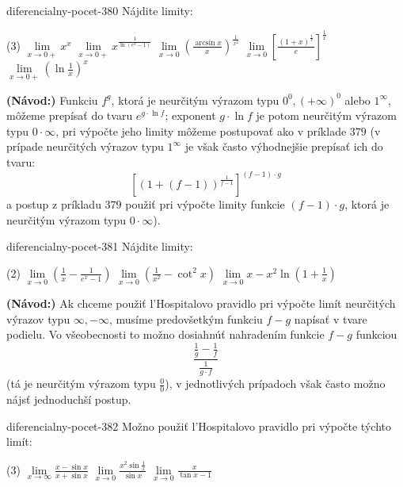 \begin{defproblem}{diferencialny-pocet-380}
Nájdite limity:
\begin{tasks}(3)
  \task $\lim\limits_{x \rightarrow 0+}x^x$
  \task $\lim\limits_{x \rightarrow 0+}x^{\frac{1}{\ln (e^x-1)}}$
  \task $\lim\limits_{x \rightarrow 0}(\frac{\arcsin x}{x})^{\frac{1}{x^2}}$
  \task $\lim\limits_{x \rightarrow 0}[\frac{(1+x)^{\frac{1}{x}}}{e}]^{\frac{1}{x}}$
  \task $\lim\limits_{x \rightarrow 0+}(\ln \frac{1}{x})^x$
\end{tasks}

\begin{solution}
  \textbf{(Návod:)}
  Funkciu $f^g$, ktorá je neurčitým výrazom typu $0^0,(+\infty)^0$ alebo
  $1^{\infty}$, môžeme prepísať do tvaru $e^{g\cdot\ln f}$; exponent $g\cdot\ln
  f$ je potom neurčitým výrazom typu $0\cdot\infty$, pri výpočte jeho limity
  môžeme postupovať ako v príklade $379$ (v prípade neurčitých výrazov typu
  $1^{\infty}$ je však často výhodnejšie prepísať ich do tvaru:
  \[
    [(1+(f-1))^{\frac{1}{f-1}}]^{(f-1)\cdot g}
  \]
  a postup z príkladu $379$ použiť pri výpočte limity funkcie $(f-1)\cdot g$,
  ktorá je neurčitým výrazom typu $0\cdot\infty$).
\end{solution}
\end{defproblem}

\begin{defproblem}{diferencialny-pocet-381}
Nájdite limity:
\begin{tasks}(2)
  \task $\lim\limits_{x \rightarrow 0}(\frac{1}{x}-\frac{1}{e^x-1})$
  \task $\lim\limits_{x \rightarrow 0}(\frac{1}{x^2}-\cot^2 x)$
  \task $\lim\limits_{x \rightarrow 0}x-x^2\ln (1+\frac{1}{x})$
\end{tasks}

\begin{solution}
  \textbf{(Návod:)}
  Ak chceme použiť l'Hospitalovo pravidlo pri výpočte limít neurčitých výrazov
  typu $\infty,-\infty$, musíme predovšetkým funkciu $f-g$ napísať v tvare
  podielu. Vo všeobecnosti to možno dosiahnúť nahradením funkcie $f-g$ funkciou
  \[
    \frac{\frac{1}{g}-\frac{1}{f}}{\frac{1}{g\cdot f}}
  \]
  (tá je neurčitým výrazom typu $\frac{0}{0}$), v jednotlivých prípadoch však
  často možno nájsť jednoduchší postup.
\end{solution}
\end{defproblem}

\begin{defproblem}{diferencialny-pocet-382}
Možno použiť l'Hospitalovo pravidlo pri výpočte týchto limít:
\begin{tasks}(3)
  \task $\lim\limits_{x \rightarrow \infty}\frac{x-\sin x}{x+\sin x}$
  \task $\lim\limits_{x \rightarrow 0}\frac{x^2\sin \frac{1}{x}}{\sin x}$
  \task $\lim\limits_{x \rightarrow 0}\frac{x}{\tan x -1}$
\end{tasks}
\end{defproblem}

